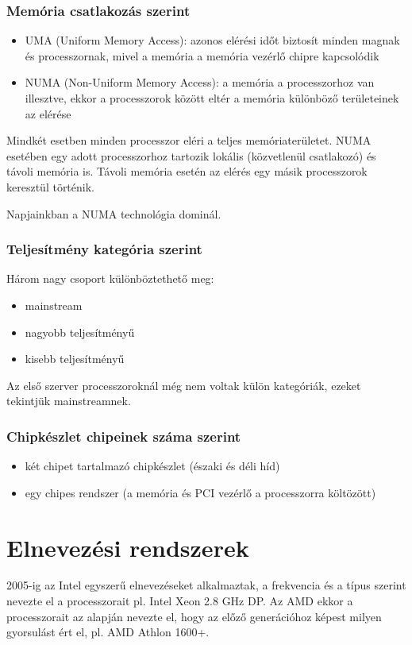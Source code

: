 \subsubsection{Memória csatlakozás szerint}
\begin{itemize}
    \item UMA (Uniform Memory Access): azonos elérési időt biztosít minden magnak és processzornak, mivel a memória a memória vezérlő chipre kapcsolódik
    \item NUMA (Non-Uniform Memory Access): a memória a processzorhoz van illesztve, ekkor a processzorok között eltér a memória különböző területeinek az elérése
\end{itemize}
Mindkét esetben minden processzor eléri a teljes memóriaterületet.
NUMA esetében egy adott processzorhoz tartozik lokális (közvetlenül csatlakozó) és távoli memória is.
Távoli memória esetén az elérés egy másik processzorok keresztül történik.

Napjainkban a NUMA technológia dominál.

\subsubsection{Teljesítmény kategória szerint}
Három nagy csoport különböztethető meg:
\begin{itemize}
    \item mainstream
    \item nagyobb teljesítményű
    \item kisebb teljesítményű
\end{itemize}
Az első szerver processzoroknál még nem voltak külön kategóriák, ezeket tekintjük mainstreamnek.

\subsubsection{Chipkészlet chipeinek száma szerint}
\begin{itemize}
    \item két chipet tartalmazó chipkészlet (északi és déli híd)
    \item egy chipes rendszer (a memória és PCI vezérlő a processzorra költözött)
\end{itemize}

\section{Elnevezési rendszerek}
2005-ig az Intel egyszerű elnevezéseket alkalmaztak, a frekvencia és a típus szerint nevezte el a processzorait pl. Intel Xeon 2.8 GHz DP.
Az AMD ekkor a processzorait az alapján nevezte el, hogy az előző generációhoz képest milyen gyorsulást ért el, pl. AMD Athlon 1600+.

